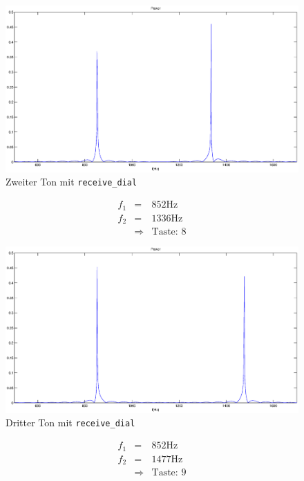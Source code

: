 \documentclass[10pt]{report}
\begin{document}
        \begin{center}
            \begin{figure}[H]
                \includegraphics[width=\textwidth]{img43542}
                \caption{Zweiter Ton mit \texttt{receive\_dial}}
            \end{figure}
        \end{center}
        \begin{eqnarray*}
            f_1 &=& 852 \si{\hertz}\\
            f_2 &=& 1336 \si{\hertz}\\
            &\Rightarrow& \text{Taste: }8
        \end{eqnarray*}

        \begin{center}
            \begin{figure}[H]
                \includegraphics[width=\textwidth]{img43543}
                \caption{Dritter Ton mit \texttt{receive\_dial}}
            \end{figure}
        \end{center}
        \begin{eqnarray*}
            f_1 &=& 852 \si{\hertz}\\
            f_2 &=& 1477 \si{\hertz}\\
            &\Rightarrow& \text{Taste: }9
        \end{eqnarray*}
\end{document}
